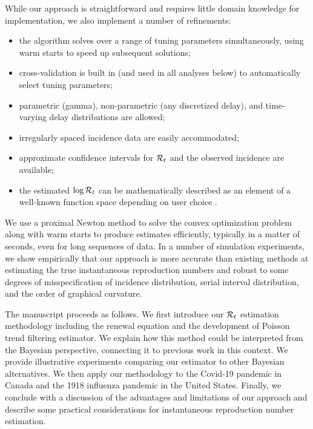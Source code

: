 While our approach is straightforward and requires little domain knowledge for
implementation, we also implement a number of refinements:
\begin{itemize}
  \item the algorithm solves over a range of tuning parameters simultaneously,
  using warm starts to speed up subsequent solutions;
  \item cross-validation is built in (and used in all analyses below) to
  automatically select tuning parameters;
  \item parametric (gamma), non-parametric (any discretized delay), and
  time-varying delay distributions are allowed;
  \item irregularly spaced incidence data are easily accommodated;
  \item approximate confidence intervals for $\mathcal{R}_t$ and the observed
  incidence are available;
  \item the estimated $\log\mathcal{R}_t$ can be mathematically described as an
  element of a well-known function space depending on user choice \citep{tibshirani2022divided}.
\end{itemize}
We use a proximal Newton method to solve the convex optimization problem along
with warm starts to produce estimates efficiently, typically in a matter of
seconds, even for long sequences of data. In a number of simulation experiments,
we show empirically that our approach is more accurate than existing methods at
estimating the true instantaneous reproduction numbers and robust to some
degrees of misspecification of incidence distribution, serial interval
distribution, and the order of graphical curvature. 


The manuscript proceeds as follows. We first introduce our $\mathcal{R}_t$
estimation methodology including the renewal equation and the development of
Poisson trend filtering estimator. We explain how this method could be
interpreted from the Bayesian perspective, connecting it to previous work in
this context. We provide illustrative experiments comparing our estimator to
other Bayesian alternatives. We then apply our methodology to the Covid-19
pandemic in Canada and the 1918 influenza pandemic in the United States.
Finally, we conclude with a discussion of the advantages and limitations of our
approach and describe some practical considerations for instantaneous
reproduction number estimation.
